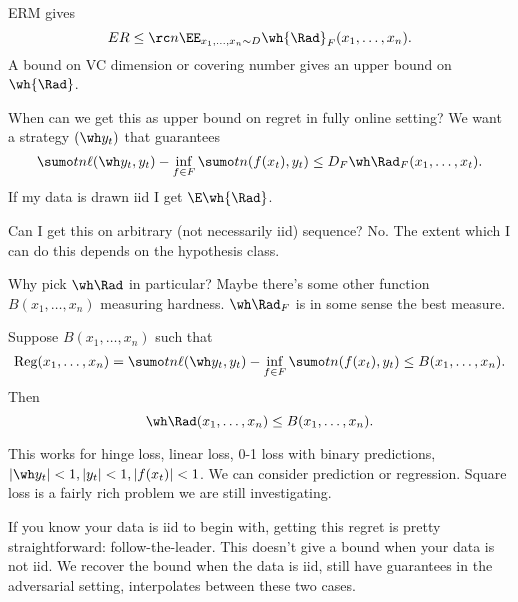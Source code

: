 ERM gives
$$
ER\le \rc n \EE_{x_1,\ldots, x_n\sim D} \wh{\Rad}_F(x_1,\ldots, x_n).
$$
A bound on VC dimension or covering number gives an upper bound on $\wh{\Rad}$. 

When can we get this as upper bound on regret in fully online setting?
We want a strategy $(\wh y_t)$ that guarantees
$$
\sumo tn \ell(\wh y_t, y_t) - \inf_{f\in F} \sumo tn (f(x_t),y_t) \le D_F\wh \Rad_F(x_1,\ldots, x_t).
$$
If my data is drawn iid I get $\E\wh{\Rad}$. 

Can I get this on arbitrary (not necessarily iid) sequence? No. The extent which I can do this depends on the hypothesis class.

Why pick $\wh \Rad$ in particular? Maybe there's some other function $B(x_1,\ldots, x_n)$ measuring hardness. $\wh\Rad_F$ is in some sense the best measure. 
\begin{lem}
Suppose $B(x_1,\ldots, x_n)$ such that 
$$
\text{Reg}(x_1,\ldots, x_n) = 
\sumo tn \ell(\wh y_t, y_t) - \inf_{f\in F} \sumo tn (f(x_t),y_t)
 \le B(x_1,\ldots, x_n).
$$
Then 
$$
\wh\Rad(x_1,\ldots, x_n) \le B(x_1,\ldots, x_n).
$$
\end{lem}
This works for hinge loss, linear loss, 0-1 loss with binary predictions, $|\wh y_t|<1, |y_t|<1, |f(x_t)|<1$. 
We can consider prediction or regression.
Square loss is a fairly rich problem we are still investigating.

If you know your data is iid to begin with, getting this regret is pretty straightforward: follow-the-leader. This doesn't give a bound when your data is not iid. We recover the bound when the data is iid, still have guarantees in the adversarial setting, interpolates between these two cases.


